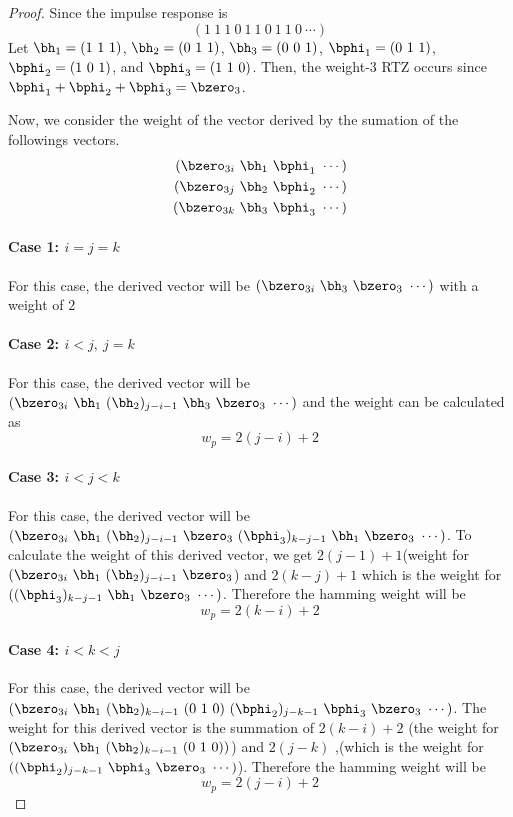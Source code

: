 \documentclass[11pt, oneside, dvipdfmx]{book}
\begin{document}
\begin{proof}
Since the impulse response is
\[
(1~1~1~0~1~1~0~1~1~0~\cdots)
\]
Let $\bh_1=(1~1~1)$, $\bh_2=(0~1~1)$, $\bh_3=(0~0~1)$, $\bphi_1 = (0~1~1)$, $\bphi_2 = (1~0~1)$, and $\bphi_3 = (1~1~0)$. Then, the weight-3 RTZ occurs since $\bphi_1+\bphi_2+\bphi_3=\bzero_3$.

Now, we consider the weight of the vector derived by the sumation of the followings vectors.
\begin{eqnarray*}
(\bzero_{3i}~\bh_1~\bphi_1~\cdots)\cr
(\bzero_{3j}~\bh_2~\bphi_2~\cdots)\cr
(\bzero_{3k}~\bh_3~\bphi_3~\cdots)
\end{eqnarray*}

\paragraph{Case 1: $i=j=k$ \newline}
 For this case, the derived vector will be $(\bzero_{3i}~\bh_3~\bzero_{3}~\cdots)$ with a weight of $2$

\paragraph{Case 2: $i<j,~j=k$ \newline}
For this case, the derived vector will be $(\bzero_{3i}~\bh_1 ~ (\bh_2)_{j-i-1}~\bh_3~\bzero_{3}~\cdots)$ and the weight can be calculated as $$w_p=2(j-i)+2$$


\paragraph{Case 3: $i<j<k$ \newline}
For this case, the derived vector will be $(\bzero_{3i}~\bh_1 ~ (\bh_2)_{j-i-1}~\bzero_{3}~(\bphi_3)_{k-j-1}~\bh_1~\bzero_{3}~\cdots )$. To calculate the weight of this derived vector, we get $2(j-1)+1$(weight for $(\bzero_{3i}~\bh_1 ~ (\bh_2)_{j-i-1}~\bzero_{3}$) and $2(k-j)+1$ which is the weight for $((\bphi_3)_{k-j-1}~\bh_1~\bzero_{3}~\cdots )$. Therefore the hamming weight will be $$w_p=2(k-i)+2$$


\paragraph{Case 4: $i<k<j$ \newline}
For this case, the derived vector will be $(\bzero_{3i}~\bh_1~(\bh_2)_{k-i-1}~ (0~1~0)~(\bphi_2)_{j-k-1} ~\bphi_3~\bzero_3~\cdots)$. 
The weight for this derived vector is the summation of $2(k-i)+2$ (the weight for $(\bzero_{3i}~\bh_1~(\bh_2)_{k-i-1}~ (0~1~0))$) and $2(j-k)$ ,(which is the weight for $((\bphi_2)_{j-k-1} ~\bphi_3~\bzero_3~\cdots)$). Therefore the hamming weight will be $$w_p=2(j-i)+2$$


\end{proof}
\end{document}
